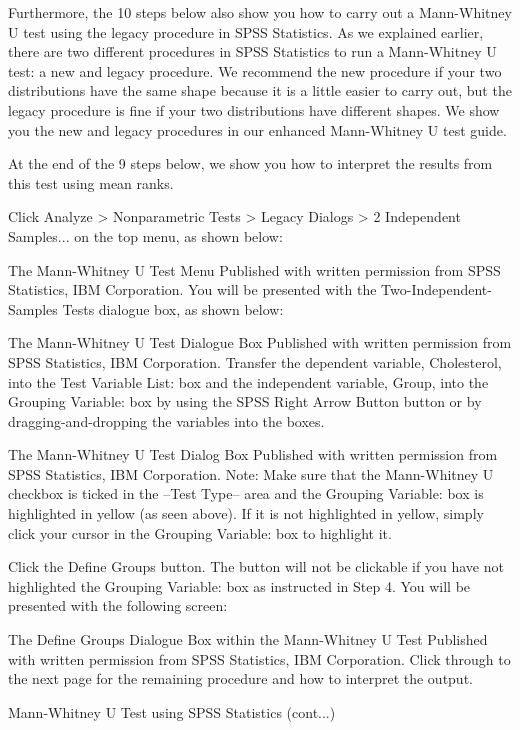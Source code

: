 \documentclass[]{article}
\begin{document}
Furthermore, the 10 steps below also show you how to carry out a Mann-Whitney U test using the legacy procedure in SPSS Statistics. As we explained earlier, there are two different procedures in SPSS Statistics to run a Mann-Whitney U test: a new and legacy procedure. We recommend the new procedure if your two distributions have the same shape because it is a little easier to carry out, but the legacy procedure is fine if your two distributions have different shapes. We show you the new and legacy procedures in our enhanced Mann-Whitney U test guide.

At the end of the 9 steps below, we show you how to interpret the results from this test using mean ranks.

Click Analyze > Nonparametric Tests > Legacy Dialogs > 2 Independent Samples... on the top menu, as shown below:

The Mann-Whitney U Test Menu
Published with written permission from SPSS Statistics, IBM Corporation.
You will be presented with the Two-Independent-Samples Tests dialogue box, as shown below:

The Mann-Whitney U Test Dialogue Box
Published with written permission from SPSS Statistics, IBM Corporation.
Transfer the dependent variable, Cholesterol, into the Test Variable List: box and the independent variable, Group, into the 
Grouping Variable: box by using the SPSS Right Arrow Button button or by dragging-and-dropping the variables into the boxes.

The Mann-Whitney U Test Dialog Box
Published with written permission from SPSS Statistics, IBM Corporation.
Note: Make sure that the Mann-Whitney U checkbox is ticked in the –Test Type– area and the Grouping Variable: box is highlighted in yellow (as seen above). If it is not highlighted in yellow, simply click your cursor in the Grouping Variable: box to highlight it.

Click the Define Groups button. The button will not be clickable if you have not highlighted the Grouping Variable: box as instructed in Step 4. You will be presented with the following screen:

The Define Groups Dialogue Box within the Mann-Whitney U Test
Published with written permission from SPSS Statistics, IBM Corporation.
Click through to the next page for the remaining procedure and how to interpret the output.

Mann-Whitney U Test using SPSS Statistics (cont...)
\end{document}
